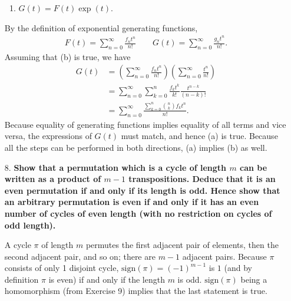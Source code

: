 \documentclass[a4paper,12pt]{article}
\begin{document}
\begin{enumerate}
\begin{enumerate}
            \item
                \textbf{$G(t) = F(t) \exp(t)$}. \par
        \end{enumerate}
        \unboldmath
        By the definition of exponential generating functions,
        \begin{align*}
            F(t) = \sum_{n = 0}^\infty \frac{f_n t^n}{n!} \qquad G(t) = \sum_{n = 0}^\infty \frac{g_n t^n}{n!}.
        \end{align*}
        Assuming that (b) is true, we have
        \begin{align*}
            G(t) &= \left( \sum_{n = 0}^\infty \frac{f_n t^n}{n!} \right)\left( \sum_{n = 0}^\infty \frac{t^n}{n!} \right) \\
            &= \sum_{n = 0}^\infty \sum_{k = 0}^n \frac{f_k t^k}{k!} \frac{t^{n - k}}{(n - k)!} \\
            &= \sum_{n = 0}^\infty \frac{\sum_{k = 0}^n \binom{n}{k} f_k t^n}{n!}.
        \end{align*}
        Because equality of generating functions implies equality of all terms and vice versa, the expressions of $G(t)$ must match, and hence (a) is true. Because all the steps can be performed in both directions, (a) implies (b) as well.

    \item[8.]
        \boldmath
        \textbf{Show that a permutation which is a cycle of length $m$ can be written as a product of $m - 1$ transpositions. Deduce that it is an even permutation if and only if its length is odd. Hence show that an arbitrary permutation is even if and only if it has an even number of cycles of even length (with no restriction on cycles of odd length).} \par
        \unboldmath
        A cycle $\pi$ of length $m$ permutes the first adjacent pair of elements, then the second adjacent pair, and so on; there are $m - 1$ adjacent pairs. Because $\pi$ consists of only 1 disjoint cycle, $\text{sign}(\pi) = (-1)^{m - 1}$ is $1$ (and by definition $\pi$ is even) if and only if the length $m$ is odd. $\text{sign}(\pi)$ being a homomorphism (from Exercise 9) implies that the last statement is true.


\end{enumerate}
\end{document}
